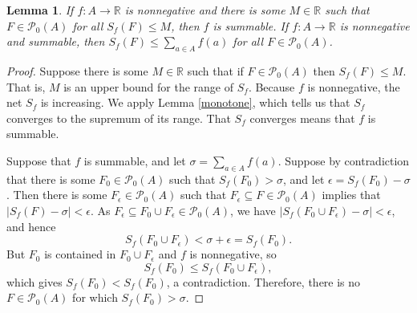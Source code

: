 \documentclass{article}
\newtheorem{lemma}[theorem]{Lemma}
\begin{document}
\begin{lemma}
If $f:A \to \mathbb{R}$ is nonnegative and there is some $M \in \mathbb{R}$ such that
$F \in \mathscr{P}_0(A)$ for all
$S_f(F) \leq M$, then $f$ is summable. If $f:A \to \mathbb{R}$ is nonnegative and  summable, then $S_f(F) \leq \sum_{a \in A} f(a)$ for all $F \in \mathscr{P}_0(A)$.
\label{bounded}
\end{lemma}
\begin{proof}
Suppose there is some $M \in \mathbb{R}$ such that if $F \in \mathscr{P}_0(A)$ then $S_f(F) \leq M$. That is, $M$ is an upper bound for the range of $S_f$.
Because $f$ is nonnegative, the net $S_f$ is increasing. We apply Lemma \ref{monotone}, which tells us that $S_f$ converges to the supremum of its
range. That $S_f$ converges means that $f$ is summable.

Suppose that $f$ is summable, and let $\sigma=\sum_{a \in A} f(a)$. Suppose by contradiction that there is some $F_0 \in \mathscr{P}_0(A)$ such that
$S_f(F_0)>\sigma$, and let $\epsilon = S_f(F_0) - \sigma$. Then there is some $F_\epsilon \in \mathscr{P}_0(A)$ such that
$F_\epsilon \subseteq F \in \mathscr{P}_0(A)$ implies that $|S_f(F) -\sigma| <\epsilon$. As $F_\epsilon \subseteq F_0 \cup F_\epsilon
\in\mathscr{P}_0(A)$, we have 
$|S_f(F_0 \cup F_\epsilon) - \sigma|<\epsilon$, and hence
\[
S_f(F_0 \cup F_\epsilon) < \sigma+\epsilon =  S_f(F_0).
\]
But $F_0$ is contained in $F_0 \cup F_\epsilon$ and $f$ is nonnegative, so
\[
S_f(F_0) \leq S_f(F_0 \cup F_\epsilon),
\]
which gives $S_f(F_0) < S_f(F_0)$, a contradiction. Therefore, there is no $F \in \mathscr{P}_0(A)$ for which $S_f(F_0) > \sigma$.
\end{proof}
\end{document}
